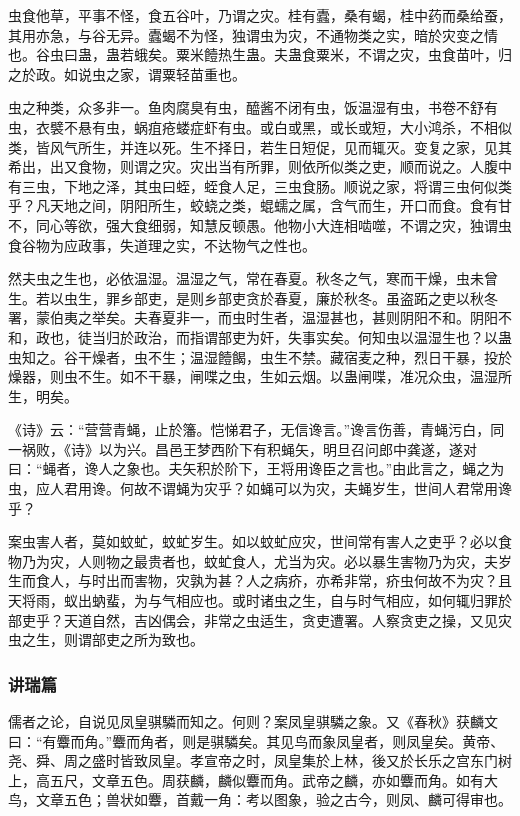 \documentclass[]{article}
\begin{document}
虫食他草，平事不怪，食五谷叶，乃谓之灾。桂有蠹，桑有蝎，桂中药而桑给蚕，其用亦急，与谷无异。蠹蝎不为怪，独谓虫为灾，不通物类之实，暗於灾变之情也。谷虫曰蛊，蛊若蛾矣。粟米饐热生蛊。夫蛊食粟米，不谓之灾，虫食苗叶，归之於政。如说虫之家，谓粟轻苗重也。

虫之种类，众多非一。鱼肉腐臭有虫，醯酱不闭有虫，饭温湿有虫，书卷不舒有虫，衣襞不悬有虫，蜗疽疮蝼症虾有虫。或白或黑，或长或短，大小鸿杀，不相似类，皆风气所生，并连以死。生不择日，若生日短促，见而辄灭。变复之家，见其希出，出又食物，则谓之灾。灾出当有所罪，则依所似类之吏，顺而说之。人腹中有三虫，下地之泽，其虫曰蛭，蛭食人足，三虫食肠。顺说之家，将谓三虫何似类乎？凡天地之间，阴阳所生，蛟蛲之类，蜫蠕之属，含气而生，开口而食。食有甘不，同心等欲，强大食细弱，知慧反顿愚。他物小大连相啮噬，不谓之灾，独谓虫食谷物为应政事，失道理之实，不达物气之性也。

然夫虫之生也，必依温湿。温湿之气，常在春夏。秋冬之气，寒而干燥，虫未曾生。若以虫生，罪乡部吏，是则乡部吏贪於春夏，廉於秋冬。虽盗跖之吏以秋冬署，蒙伯夷之举矣。夫春夏非一，而虫时生者，温湿甚也，甚则阴阳不和。阴阳不和，政也，徒当归於政治，而指谓部吏为奸，失事实矣。何知虫以温湿生也？以蛊虫知之。谷干燥者，虫不生；温湿饐餲，虫生不禁。藏宿麦之种，烈日干暴，投於燥器，则虫不生。如不干暴，闸喋之虫，生如云烟。以蛊闸喋，准况众虫，温湿所生，明矣。

《诗》云：``营营青蝇，止於籓。恺悌君子，无信谗言。''谗言伤善，青蝇污白，同一祸败，《诗》以为兴。昌邑王梦西阶下有积蝇矢，明旦召问郎中龚遂，遂对曰：``蝇者，谗人之象也。夫矢积於阶下，王将用谗臣之言也。''由此言之，蝇之为虫，应人君用谗。何故不谓蝇为灾乎？如蝇可以为灾，夫蝇岁生，世间人君常用谗乎？

案虫害人者，莫如蚊虻，蚊虻岁生。如以蚊虻应灾，世间常有害人之吏乎？必以食物乃为灾，人则物之最贵者也，蚊虻食人，尤当为灾。必以暴生害物乃为灾，夫岁生而食人，与时出而害物，灾孰为甚？人之病疥，亦希非常，疥虫何故不为灾？且天将雨，蚁出蚋蜚，为与气相应也。或时诸虫之生，自与时气相应，如何辄归罪於部吏乎？天道自然，吉凶偶会，非常之虫适生，贪吏遭署。人察贪吏之操，又见灾虫之生，则谓部吏之所为致也。

\hypertarget{header-n717}{%
\subsubsection{讲瑞篇}\label{header-n717}}

儒者之论，自说见凤皇骐驎而知之。何则？案凤皇骐驎之象。又《春秋》获麟文曰：``有麞而角。''麞而角者，则是骐驎矣。其见鸟而象凤皇者，则凤皇矣。黄帝、尧、舜、周之盛时皆致凤皇。孝宣帝之时，凤皇集於上林，後又於长乐之宫东门树上，高五尺，文章五色。周获麟，麟似麞而角。武帝之麟，亦如麞而角。如有大鸟，文章五色；兽状如麞，首戴一角：考以图象，验之古今，则凤、麟可得审也。
\end{document}
